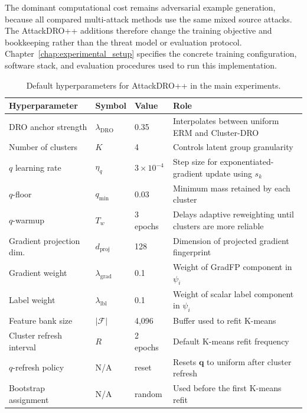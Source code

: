 The dominant computational cost remains adversarial example generation, because
all compared multi-attack methods use the same mixed source attacks. The
AttackDRO++ additions therefore change the training objective and bookkeeping
rather than the threat model or evaluation protocol. Chapter~\ref{chap:experimental_setup}
specifies the concrete training configuration, software stack, and evaluation
procedures used to run this implementation.

\begin{table}[H]
\centering
\caption{Default hyperparameters for AttackDRO++ in the main experiments.}
\label{tab:ch4_hparams}
\small
\begin{tabularx}{\textwidth}{@{}l l l X@{}}
\toprule
Hyperparameter & Symbol & Value & Role \\
\midrule
DRO anchor strength      & \(\lambda_{\mathrm{DRO}}\)  & 0.35  & Interpolates between uniform ERM and Cluster-DRO \\
Number of clusters       & \(K\)                       & 4     & Controls latent group granularity \\
\(q\) learning rate      & \(\eta_q\)                  & \(3\times10^{-4}\) & Step size for exponentiated-gradient update using \(s_k\) \\
\(q\)-floor              & \(q_{\min}\)                & 0.03  & Minimum mass retained by each cluster \\
\(q\)-warmup             & \(T_w\)                     & 3 epochs & Delays adaptive reweighting until clusters are more reliable \\
Gradient projection dim. & \(d_{\mathrm{proj}}\)       & 128   & Dimension of projected gradient fingerprint \\
Gradient weight          & \(\lambda_{\mathrm{grad}}\) & 0.1   & Weight of GradFP component in \(\psi_i\) \\
Label weight             & \(\lambda_{\mathrm{lbl}}\)  & 0.1   & Weight of scalar label component in \(\psi_i\) \\
Feature bank size        & \(|\mathcal{F}|\)           & 4{,}096 & Buffer used to refit K-means \\
Cluster refresh interval & \(R\)                       & 2 epochs & Default K-means refit frequency \\
\(q\)-refresh policy     & N/A                         & reset & Resets \(\mathbf{q}\) to uniform after cluster refresh \\
Bootstrap assignment     & N/A                         & random & Used before the first K-means refit \\
\bottomrule
\end{tabularx}
\end{table}
